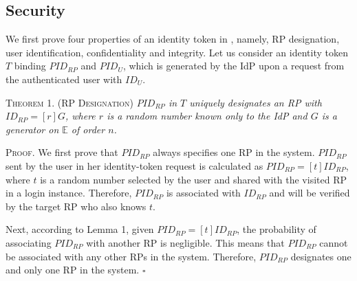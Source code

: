 \subsection{Security}
\label{analysis-security}


We first prove four properties of an identity token in \usso,
namely, RP designation, user identification, confidentiality and integrity.
Let us consider an identity token $T$ binding $PID_{RP}$ and $PID_U$, which is generated by the IdP upon a request from the authenticated user with $ID_U$.


\vspace{1mm}
\noindent\textsc{Theorem 1. (RP Designation)} {\em $PID_{RP}$ in $T$ uniquely designates an RP with $ID_{RP} = [r]G$,
 where $r$ is a random number known only to the IdP and $G$ is a generator on $\mathbb{E}$ of order $n$.}

\vspace{0.75mm}
\noindent\textsc{Proof.} We first prove that $PID_{RP}$ always specifies one RP in the system.
$PID_{RP}$ sent by the user in her identity-token request is calculated as $PID_{RP} = [t]ID_{RP}$,
 where $t$ is a random number selected by the user and shared with the visited RP in a login instance.
 Therefore, $PID_{RP}$ is associated with $ID_{RP}$ and will be verified by the target RP who also knows $t$.

Next, according to Lemma 1, given $PID_{RP} = [t]ID_{RP}$, the probability of associating $PID_{RP}$ with another RP is negligible. This means that $PID_{RP}$ cannot be associated with any other RPs in the system. Therefore, $PID_{RP}$ designates one and only one RP in the system.  \hfill $\square$

